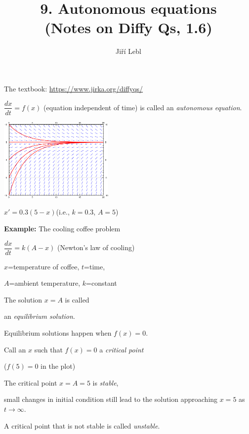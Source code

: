 \documentclass[10pt,aspectratio=169]{beamer}
\author{Ji\v{r}\'i Lebl}
\institute[OSU]{%
Oklahoma State University%
}
\title{9. Autonomous equations\\(Notes on Diffy Qs, 1.6)}
\date{}
\begin{document}
\begin{frame}
\titlepage


\begin{center}
The textbook: \url{https://www.jirka.org/diffyqs/}
\end{center}
\end{frame}

\begin{frame}
$\dfrac{dx}{dt} = f(x)$\quad
(equation independent of time)
is called an
\emph{autonomous equation}.

\medskip
\pause

\hspace*{3.1in} \includegraphics[width=2.2in]{../figures/2-2-coffee}

\hspace*{3.1in} $x' = 0.3(5-x)$\quad (i.e., $k=0.3$, $A=5$)

\vspace*{-1.8in}

\textbf{Example:} The cooling coffee problem

\medskip

$\dfrac{dx}{dt} = k (A-x)$
\quad
(Newton's law of cooling)

\medskip

$x$=temperature of coffee, $t$=time,

$A$=ambient temperature, $k$=constant

\medskip
\pause

The solution $x=A$ is called

an \emph{equilibrium solution}.

\medskip
\pause

Equilibrium solutions happen when $f(x)=0$.

\medskip
\pause

Call an $x$ such that $f(x)=0$ a \emph{critical point}

($f(5)=0$ in the plot)

\medskip
\pause

The critical point $x=A=5$ is \emph{stable},

small changes in initial condition still lead to the solution approaching
$x=5$ as $t \to \infty$.

\medskip
\pause

A critical point that is not stable is called \emph{unstable}.

\end{frame}
\end{document}
